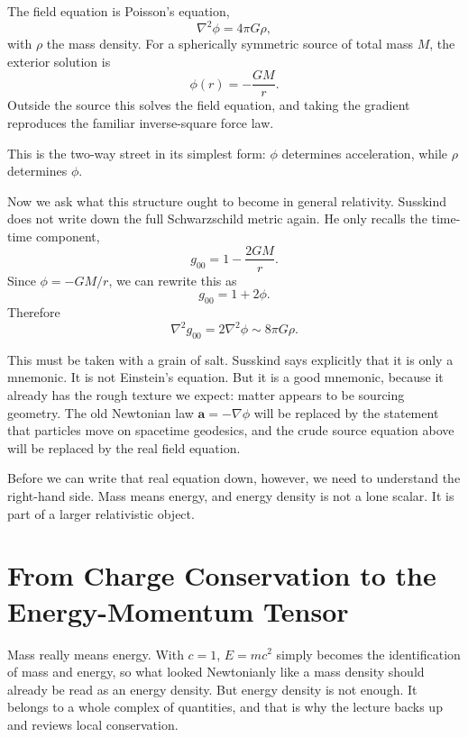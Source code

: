 The field equation is Poisson's equation,
\begin{equation}
\nabla^2\phi = 4\pi G\rho,
\end{equation}
with \(\rho\) the mass density. For a spherically symmetric source of total mass \(M\), the exterior solution is
\begin{equation}
\phi(r)=-\frac{GM}{r}.
\end{equation}
Outside the source this solves the field equation, and taking the gradient reproduces the familiar inverse-square force law.

This is the two-way street in its simplest form: \(\phi\) determines acceleration, while \(\rho\) determines \(\phi\).

Now we ask what this structure ought to become in general relativity. Susskind does not write down the full Schwarzschild metric again. He only recalls the time-time component,
\begin{equation}
g_{00}=1-\frac{2GM}{r}.
\end{equation}
Since \(\phi=-GM/r\), we can rewrite this as
\begin{equation}
g_{00}=1+2\phi.
\end{equation}
Therefore
\begin{equation}
\nabla^2 g_{00}=2\nabla^2\phi\sim 8\pi G\rho.
\end{equation}

This must be taken with a grain of salt. Susskind says explicitly that it is only a mnemonic. It is not Einstein's equation. But it is a good mnemonic, because it already has the rough texture we expect: matter appears to be sourcing geometry. The old Newtonian law \(\mathbf a=-\nabla\phi\) will be replaced by the statement that particles move on spacetime geodesics, and the crude source equation above will be replaced by the real field equation.

Before we can write that real equation down, however, we need to understand the right-hand side. Mass means energy, and energy density is not a lone scalar. It is part of a larger relativistic object.

\section{From Charge Conservation to the Energy-Momentum Tensor}

Mass really means energy. With \(c=1\), \(E=mc^2\) simply becomes the identification of mass and energy, so what looked Newtonianly like a mass density should already be read as an energy density. But energy density is not enough. It belongs to a whole complex of quantities, and that is why the lecture backs up and reviews local conservation.

